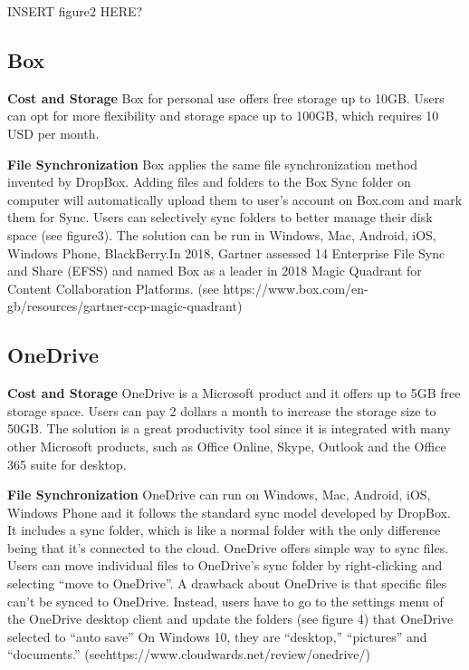 \documentclass{article}
\begin{document}
INSERT figure2 HERE?

\newline

\subsection{Box}
\textbf{Cost and Storage}
Box for personal use offers free storage up to 10GB. Users can opt for more flexibility and storage space up to 100GB, which requires 10 USD per month.

\newline
\hfill \break
\textbf{File Synchronization}
Box applies the same file synchronization method invented by DropBox. Adding files and folders to the Box Sync folder on computer will automatically upload them to user’s account on Box.com and mark them for Sync. Users can selectively sync folders to better manage their disk space (see figure3). The solution can be run in Windows, Mac, Android, iOS, Windows Phone, BlackBerry.In 2018, Gartner assessed 14 Enterprise File Sync and Share (EFSS) and named Box as a leader in
2018 Magic Quadrant for Content Collaboration Platforms. (see  https://www.box.com/en-gb/resources/gartner-ccp-magic-quadrant)

\newline
\hfill \break
\subsection{OneDrive}
\textbf{Cost and Storage}
OneDrive is a Microsoft product and it offers up to 5GB free storage space. Users can pay 2 dollars a month to increase the storage size to 50GB. The solution is a great productivity tool since it is integrated with many other Microsoft products, such as Office Online, Skype, Outlook and the Office 365 suite for desktop.

\newline
\hfill \break
\textbf{File Synchronization}
OneDrive can run on Windows, Mac, Android, iOS, Windows Phone and it follows the standard sync model developed by DropBox. It includes a sync folder, which is like a normal folder with the only difference being that it’s connected to the cloud. OneDrive offers simple way to sync files. Users can move individual files to OneDrive’s sync folder by right-clicking and selecting “move to OneDrive”. A drawback about OneDrive is that specific files can’t be synced to OneDrive. Instead, users have to go to the settings menu of the OneDrive desktop client and update the folders (see figure 4) that OneDrive selected to “auto save” On Windows 10, they are “desktop,” “pictures” and “documents.” (seehttps://www.cloudwards.net/review/onedrive/)
\end{document}
